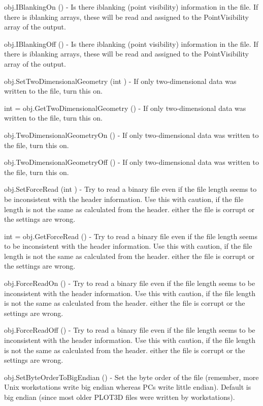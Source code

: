 \begin{DoxyItemize}
\item {\ttfamily obj.\-I\-Blanking\-On ()} -\/ Is there iblanking (point visibility) information in the file. If there is iblanking arrays, these will be read and assigned to the Point\-Visibility array of the output.  
\item {\ttfamily obj.\-I\-Blanking\-Off ()} -\/ Is there iblanking (point visibility) information in the file. If there is iblanking arrays, these will be read and assigned to the Point\-Visibility array of the output.  
\item {\ttfamily obj.\-Set\-Two\-Dimensional\-Geometry (int )} -\/ If only two-\/dimensional data was written to the file, turn this on.  
\item {\ttfamily int = obj.\-Get\-Two\-Dimensional\-Geometry ()} -\/ If only two-\/dimensional data was written to the file, turn this on.  
\item {\ttfamily obj.\-Two\-Dimensional\-Geometry\-On ()} -\/ If only two-\/dimensional data was written to the file, turn this on.  
\item {\ttfamily obj.\-Two\-Dimensional\-Geometry\-Off ()} -\/ If only two-\/dimensional data was written to the file, turn this on.  
\item {\ttfamily obj.\-Set\-Force\-Read (int )} -\/ Try to read a binary file even if the file length seems to be inconsistent with the header information. Use this with caution, if the file length is not the same as calculated from the header. either the file is corrupt or the settings are wrong.  
\item {\ttfamily int = obj.\-Get\-Force\-Read ()} -\/ Try to read a binary file even if the file length seems to be inconsistent with the header information. Use this with caution, if the file length is not the same as calculated from the header. either the file is corrupt or the settings are wrong.  
\item {\ttfamily obj.\-Force\-Read\-On ()} -\/ Try to read a binary file even if the file length seems to be inconsistent with the header information. Use this with caution, if the file length is not the same as calculated from the header. either the file is corrupt or the settings are wrong.  
\item {\ttfamily obj.\-Force\-Read\-Off ()} -\/ Try to read a binary file even if the file length seems to be inconsistent with the header information. Use this with caution, if the file length is not the same as calculated from the header. either the file is corrupt or the settings are wrong.  
\item {\ttfamily obj.\-Set\-Byte\-Order\-To\-Big\-Endian ()} -\/ Set the byte order of the file (remember, more Unix workstations write big endian whereas P\-Cs write little endian). Default is big endian (since most older P\-L\-O\-T3\-D files were written by workstations).  

\end{DoxyItemize}
